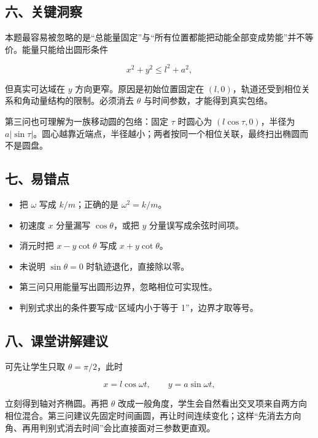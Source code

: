\documentclass[12pt,a4paper,UTF8]{ctexart}
\newcommand{\tightlist}{\setlength{\itemsep}{0pt}\setlength{\parskip}{0pt}}
\begin{document}
\subsection{六、关键洞察}\label{ux516dux5173ux952eux6d1eux5bdf}

本题最容易被忽略的是``总能量固定''与``所有位置都能把动能全部变成势能''并不等价。能量只能给出圆形条件

\[x^2+y^2\le l^2+a^2,\]

但真实可达域在 \(y\) 方向更窄。原因是初始位置固定在
\((l,0)\)，轨道还受到相位关系和角动量结构的限制。必须消去 \(\theta\)
与时间参数，才能得到真实包络。

第三问也可理解为一族移动圆的包络：固定 \(\tau\) 时圆心为
\((l\cos\tau,0)\)，半径为
\(a|\sin\tau|\)。圆心越靠近端点，半径越小；两者按同一个相位关联，最终扫出椭圆而不是圆盘。

\subsection{七、易错点}\label{ux4e03ux6613ux9519ux70b9}

\begin{itemize}
\tightlist
\item
  把 \(\omega\) 写成 \(k/m\)；正确的是 \(\omega^2=k/m\)。
\item
  初速度 \(x\) 分量漏写 \(\cos\theta\)，或把 \(y\)
  分量误写成余弦时间项。
\item
  消元时把 \(x-y\cot\theta\) 写成 \(x+y\cot\theta\)。
\item
  未说明 \(\sin\theta=0\) 时轨迹退化，直接除以零。
\item
  第三问只用能量写出圆形边界，忽略相位可实现性。
\item
  判别式求出的条件要写成``区域内小于等于 1''，边界才取等号。
\end{itemize}

\subsection{八、课堂讲解建议}\label{ux516bux8bfeux5802ux8bb2ux89e3ux5efaux8bae}

可先让学生只取 \(\theta=\pi/2\)，此时

\[x=l\cos\omega t,\qquad y=a\sin\omega t,\]

立刻得到轴对齐椭圆。再把 \(\theta\)
改成一般角度，学生会自然看出交叉项来自两方向相位混合。第三问建议先固定时间画圆，再让时间连续变化；这样``先消去方向角、再用判别式消去时间''会比直接面对三参数更直观。
\end{document}
